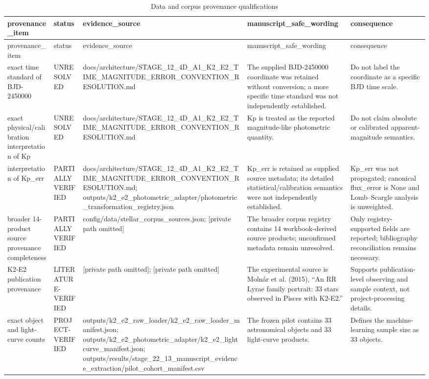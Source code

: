 \begin{longtable}{lllll}
\caption{Data and corpus provenance qualifications}\\
\toprule
provenance\_item & status & evidence\_source & manuscript\_safe\_wording & consequence \\
\midrule
\endfirsthead
\toprule
provenance\_item & status & evidence\_source & manuscript\_safe\_wording & consequence \\
\midrule
\endhead
exact time standard of BJD-2450000 & UNRESOLVED & docs/architecture/STAGE\_12\_4D\_A1\_K2\_E2\_TIME\_MAGNITUDE\_ERROR\_CONVENTION\_RESOLUTION.md & The supplied BJD-2450000 coordinate was retained without conversion; a more specific time standard was not independently established. & Do not label the coordinate as a specific BJD time scale. \\
exact physical/calibration interpretation of Kp & UNRESOLVED & docs/architecture/STAGE\_12\_4D\_A1\_K2\_E2\_TIME\_MAGNITUDE\_ERROR\_CONVENTION\_RESOLUTION.md & Kp is treated as the reported magnitude-like photometric quantity. & Do not claim absolute or calibrated apparent-magnitude semantics. \\
interpretation of Kp\_err & PARTIALLY VERIFIED & docs/architecture/STAGE\_12\_4D\_A1\_K2\_E2\_TIME\_MAGNITUDE\_ERROR\_CONVENTION\_RESOLUTION.md; outputs/k2\_e2\_photometric\_adapter/photometric\_transformation\_registry.json & Kp\_err is retained as supplied source metadata; its detailed statistical/calibration semantics were not independently established. & Kp\_err was not propagated; canonical flux\_error is None and Lomb–Scargle analysis is unweighted. \\
broader 14-product source provenance completeness & PARTIALLY VERIFIED & config/data/stellar\_corpus\_sources.json; [private path omitted] & The broader corpus registry contains 14 workbook-derived source products; unconfirmed metadata remain unresolved. & Only registry-supported fields are reported; bibliography reconciliation remains necessary. \\
K2-E2 publication provenance & LITERATURE-VERIFIED & [private path omitted]; [private path omitted] & The experimental source is Molnár et al. (2015), “An RR Lyrae family portrait: 33 stars observed in Pisces with K2-E2.” & Supports publication-level observing and sample context, not project-processing details. \\
exact object and light-curve counts & PROJECT-VERIFIED & outputs/k2\_e2\_raw\_loader/k2\_e2\_raw\_loader\_manifest.json; outputs/k2\_e2\_photometric\_adapter/k2\_e2\_lightcurve\_manifest.json; outputs/results/stage\_22\_13\_manuscript\_evidence\_extraction/pilot\_cohort\_manifest.csv & The frozen pilot contains 33 astronomical objects and 33 light-curve products. & Defines the machine-learning sample size as 33 objects. \\

\end{longtable}
